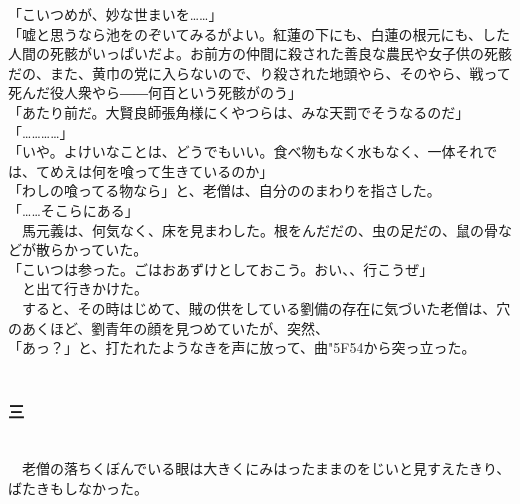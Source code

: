 \documentclass[
  paper=a5,
  fontsize=10pt,
  jafontsize=9.5pt,
  tate,                  %
  open_bracket_pos=nibu, %
]{jlreq}
\begin{document}
「こいつめが、妙な世まいを……」\\


「嘘と思うなら池をのぞいてみるがよい。紅蓮の下にも、白蓮の根元にも、した人間の死骸がいっぱいだよ。お前方の仲間に殺された善良な農民や女子供の死骸だの、また、黄巾の党に入らないので、り殺された地頭やら、そのやら、戦って死んだ役人衆やら――何百という死骸がのう」\\


「あたり前だ。大賢良師張角様にくやつらは、みな天罰でそうなるのだ」\\


「…………」\\


「いや。よけいなことは、どうでもいい。食べ物もなく水もなく、一体それでは、てめえは何を喰って生きているのか」\\


「わしの喰ってる物なら」と、老僧は、自分ののまわりを指さした。\\


「……そこらにある」\\


　馬元義は、何気なく、床を見まわした。根をんだだの、虫の足だの、鼠の骨などが散らかっていた。\\


「こいつは参った。ごはおあずけとしておこう。おい、、行こうぜ」\\


　と出て行きかけた。\\


　すると、その時はじめて、賊の供をしている劉備の存在に気づいた老僧は、穴のあくほど、劉青年の顔を見つめていたが、突然、\\


「あっ？」と、打たれたようなきを声に放って、曲{\char"5F54}から突っ立った。\\

\\

\subsubsection{三}

\\


　老僧の落ちくぼんでいる眼は大きくにみはったままのをじいと見すえたきり、ばたきもしなかった。\\
\end{document}
